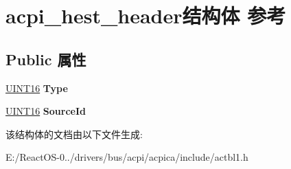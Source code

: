 \hypertarget{structacpi__hest__header}{}\section{acpi\+\_\+hest\+\_\+header结构体 参考}
\label{structacpi__hest__header}
\subsection*{Public 属性}
\begin{DoxyCompactItemize}
\item 
\mbox{\label{structacpi__hest__header_a6d6ca947aafe947dcb95af00423c116c}} 
\hyperlink{_processor_bind_8h_a09f1a1fb2293e33483cc8d44aefb1eb1}{U\+I\+N\+T16} {\bfseries Type}
\item 
\mbox{\label{structacpi__hest__header_a52ed298102d80eae8e061491b73bbf0e}} 
\hyperlink{_processor_bind_8h_a09f1a1fb2293e33483cc8d44aefb1eb1}{U\+I\+N\+T16} {\bfseries Source\+Id}
\end{DoxyCompactItemize}


该结构体的文档由以下文件生成\+:\begin{DoxyCompactItemize}
\item 
E\+:/\+React\+O\+S-\/0../drivers/bus/acpi/acpica/include/actbl1.\+h\end{DoxyCompactItemize}
